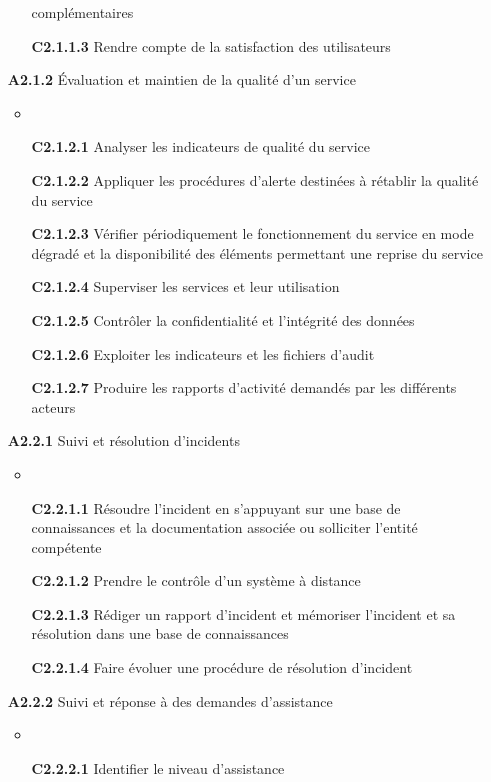 \documentclass[12pt,a4paper,oneside,titlepage,final]{article}
\begin{document}
\begin{enumerate}
\begin{itemize}
    complémentaires
    \item [\textbf{C2.1.1.3}] Rendre compte de la satisfaction des
    utilisateurs
  \end{itemize}
  \item [\textbf{A2.1.2}] Évaluation et maintien de la qualité d'un
  service
  \begin{itemize}
    \item \item [\textbf{C2.1.2.1}] Analyser les indicateurs de
    qualité du service
    \item [\textbf{C2.1.2.2}] Appliquer les procédures d'alerte
    destinées à rétablir la qualité du service
    \item [\textbf{C2.1.2.3}] Vérifier périodiquement le
    fonctionnement du service en mode dégradé et la disponibilité des
    éléments permettant une reprise du service
    \item [\textbf{C2.1.2.4}] Superviser les services et leur
    utilisation
    \item [\textbf{C2.1.2.5}] Contrôler la confidentialité et
    l'intégrité des données
    \item [\textbf{C2.1.2.6}] Exploiter les indicateurs et les
    fichiers d'audit
    \item [\textbf{C2.1.2.7}] Produire les rapports d'activité
    demandés par les différents acteurs
  \end{itemize}
  \item [\textbf{A2.2.1}] Suivi et résolution d'incidents
  \begin{itemize}
    \item \item [\textbf{C2.2.1.1}] Résoudre l'incident en s'appuyant
    sur une base de connaissances et la documentation associée ou
    solliciter l'entité compétente
    \item [\textbf{C2.2.1.2}] Prendre le contrôle d'un système à
    distance
    \item [\textbf{C2.2.1.3}] Rédiger un rapport d'incident et
    mémoriser l'incident et sa résolution dans une base de
    connaissances
    \item [\textbf{C2.2.1.4}] Faire évoluer une procédure de
    résolution d'incident
  \end{itemize}
  \item [\textbf{A2.2.2}] Suivi et réponse à des demandes d'assistance
  \begin{itemize}
    \item \item [\textbf{C2.2.2.1}] Identifier le niveau d'assistance

\end{itemize}
\end{enumerate}
\end{document}
